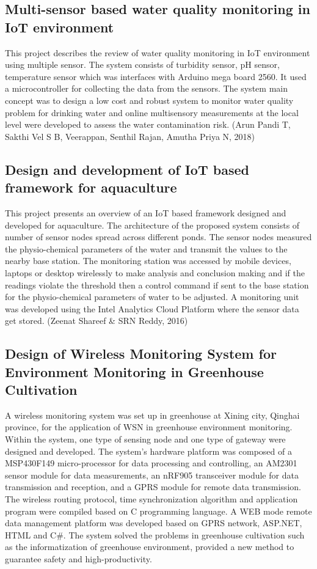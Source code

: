 \documentclass[12pt]{article}
\begin{document}
				\subsection*{Multi-sensor based water quality monitoring in IoT environment}
				This project describes the review of water quality monitoring in IoT environment using multiple sensor. The system consists of turbidity sensor, pH sensor, temperature sensor which was interfaces with Arduino mega board 2560. It used a microcontroller for collecting the data from the sensors. The system main concept was to design a low cost and robust system to monitor water quality problem for drinking water and online multisensory measurements at the local level were developed to assess the water contamination risk. (Arun Pandi T, Sakthi Vel S B, Veerappan, Senthil Rajan, Amutha Priya N, 2018)
				
				\subsection*{Design and development of IoT based framework for aquaculture}
				This project presents an overview of an IoT based framework designed and developed for aquaculture. The architecture of the proposed system consists of number of sensor nodes spread across different ponds. The sensor nodes measured the physio-chemical parameters of the water and transmit the values to the nearby base station. The monitoring station was accessed by mobile devices, laptops or desktop wirelessly to make analysis and conclusion making and if the readings violate the threshold then a control command if sent to the base station for the physio-chemical parameters of water to be adjusted. A monitoring unit was developed using the Intel Analytics Cloud Platform where the sensor data get stored. (Zeenat Shareef \& SRN Reddy, 2016)
				\subsection*{Design of Wireless Monitoring System for Environment Monitoring in Greenhouse Cultivation}		
				A wireless monitoring system was set up in greenhouse at Xining city, Qinghai province, for the application of WSN in greenhouse environment monitoring. Within the system, one type of sensing node and one type of gateway were designed and developed. The system’s hardware platform was composed of a MSP430F149 micro-processor for data processing and controlling, an AM2301 sensor module for data measurements, an nRF905 transceiver module for data transmission and reception, and a GPRS module for remote data transmission. The wireless routing protocol, time synchronization algorithm and application program were compiled based on C programming language. A WEB mode remote data management platform was developed based on GPRS network, ASP.NET, HTML and C\#. The system solved the problems in greenhouse cultivation such as the informatization of greenhouse environment, provided a new method to guarantee safety and high-productivity.
				
\end{document}
